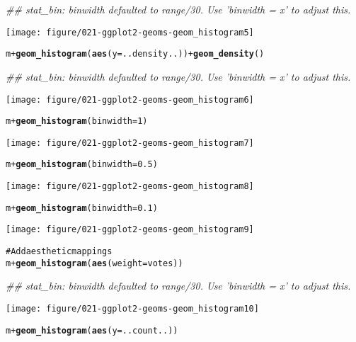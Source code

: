 \documentclass[a4paper,titlepage]{tufte-handout}\usepackage{graphicx, color}
\makeatletter
\def\maxwidth{ %
  \ifdim\Gin@nat@width>\linewidth
    \linewidth
  \else
    \Gin@nat@width
  \fi
}
\newcommand{\hlfunctioncall}[1]{\textcolor[rgb]{0.501960784313725,0,0.329411764705882}{\textbf{#1}}}%
\newcommand{\hlcomment}[1]{\textcolor[rgb]{0.180392156862745,0.6,0.341176470588235}{#1}}%
\newenvironment{kframe}{%
 \def\at@end@of@kframe{}%
 \ifinner\ifhmode%
  \def\at@end@of@kframe{\end{minipage}}%
  \begin{minipage}{\columnwidth}%
 \fi\fi%
 \def\FrameCommand##1{\hskip\@totalleftmargin \hskip-\fboxsep
 \colorbox{shadecolor}{##1}\hskip-\fboxsep
     \hskip-\linewidth \hskip-\@totalleftmargin \hskip\columnwidth}%
 \MakeFramed {\advance\hsize-\width
   \@totalleftmargin\z@ \linewidth\hsize
   \@setminipage}}%
 {\par\unskip\endMakeFramed%
 \at@end@of@kframe}
\newenvironment{knitrout}{}{} %
\makeatother
\begin{document}
\begin{knitrout}
\begin{kframe}
{\ttfamily\noindent\itshape\textcolor{messagecolor}{\#\# stat\_bin: binwidth defaulted to range/30. Use 'binwidth = x' to adjust this.}}\end{kframe}\texttt{[image: figure/021-ggplot2-geoms-geom\_histogram5]} \begin{kframe}\begin{alltt}
m + \hlfunctioncall{geom_histogram}(\hlfunctioncall{aes}(y = ..density..)) + \hlfunctioncall{geom_density}()
\end{alltt}


{\ttfamily\noindent\itshape\textcolor{messagecolor}{\#\# stat\_bin: binwidth defaulted to range/30. Use 'binwidth = x' to adjust this.}}\end{kframe}\texttt{[image: figure/021-ggplot2-geoms-geom\_histogram6]} \begin{kframe}\begin{alltt}
m + \hlfunctioncall{geom_histogram}(binwidth = 1)
\end{alltt}
\end{kframe}\texttt{[image: figure/021-ggplot2-geoms-geom\_histogram7]} \begin{kframe}\begin{alltt}
m + \hlfunctioncall{geom_histogram}(binwidth = 0.5)
\end{alltt}
\end{kframe}\texttt{[image: figure/021-ggplot2-geoms-geom\_histogram8]} \begin{kframe}\begin{alltt}
m + \hlfunctioncall{geom_histogram}(binwidth = 0.1)
\end{alltt}
\end{kframe}\texttt{[image: figure/021-ggplot2-geoms-geom\_histogram9]} \begin{kframe}\begin{alltt}
\hlcomment{# Add aesthetic mappings}
m + \hlfunctioncall{geom_histogram}(\hlfunctioncall{aes}(weight = votes))
\end{alltt}


{\ttfamily\noindent\itshape\textcolor{messagecolor}{\#\# stat\_bin: binwidth defaulted to range/30. Use 'binwidth = x' to adjust this.}}\end{kframe}\texttt{[image: figure/021-ggplot2-geoms-geom\_histogram10]} \begin{kframe}\begin{alltt}
m + \hlfunctioncall{geom_histogram}(\hlfunctioncall{aes}(y = ..count..))
\end{alltt}



\end{kframe}
\end{knitrout}
\end{document}
